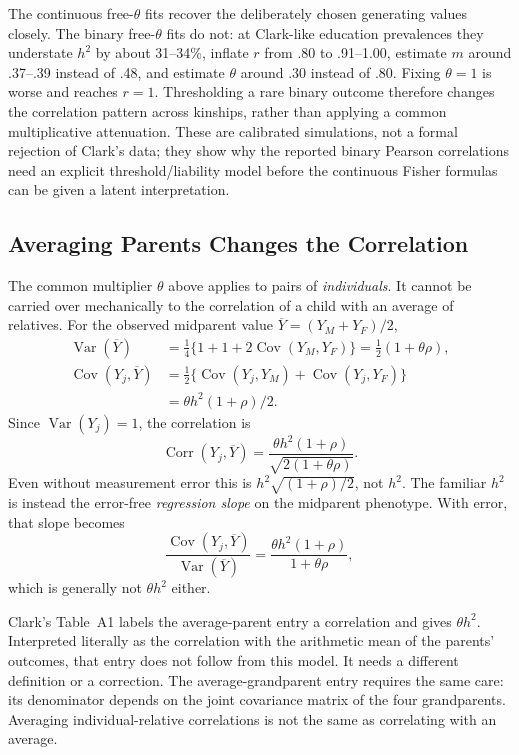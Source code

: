 The continuous free-$\theta$ fits recover the deliberately chosen generating
values closely. The binary free-$\theta$ fits do not: at Clark-like education
prevalences they understate $h^2$ by about 31--34\%, inflate $r$ from .80 to
.91--1.00, estimate $m$ around .37--.39 instead of .48, and estimate
$\theta$ around .30 instead of .80. Fixing $\theta=1$ is worse and reaches
$r=1$. Thresholding a rare binary outcome therefore changes the correlation
pattern across kinships, rather than applying a common multiplicative
attenuation. These are calibrated simulations, not a formal rejection of
Clark's data; they show why the reported binary Pearson correlations need an
explicit threshold/liability model before the continuous Fisher formulas can
be given a latent interpretation.
\subsection{Averaging Parents Changes the Correlation}
\label{sec:me-averages}

The common multiplier $\theta$ above applies to pairs of \emph{individuals}.
It cannot be carried over mechanically to the correlation of a child
with an average of relatives. For the observed midparent value
$\overline Y=(Y_M+Y_F)/2$,
\begin{align*}
 \operatorname{Var}(\overline Y)
 &=\tfrac14\{1+1+2\operatorname{Cov}(Y_M,Y_F)\}
   =\tfrac12(1+\theta\rho),\\
 \operatorname{Cov}(Y_j,\overline Y)
 &=\tfrac12\{\operatorname{Cov}(Y_j,Y_M)
             +\operatorname{Cov}(Y_j,Y_F)\}\\
 &=\theta h^2(1+\rho)/2.
\end{align*}
Since $\operatorname{Var}(Y_j)=1$, the correlation is
\begin{equation}
 \boxed{\operatorname{Corr}(Y_j,\overline Y)
 =\frac{\theta h^2(1+\rho)}
        {\sqrt{2(1+\theta\rho)}}.}
 \label{eq:me-midparent}
\end{equation}
Even without measurement error this is
$h^2\sqrt{(1+\rho)/2}$, not $h^2$. The familiar $h^2$ is instead the
error-free \emph{regression slope} on the midparent phenotype.
With error, that slope becomes
\[
 \frac{\operatorname{Cov}(Y_j,\overline Y)}
      {\operatorname{Var}(\overline Y)}
 =\frac{\theta h^2(1+\rho)}{1+\theta\rho},
\]
which is generally not $\theta h^2$ either.

Clark's Table~A1 labels the average-parent entry a correlation and gives
$\theta h^2$. Interpreted literally as the correlation with the arithmetic
mean of the parents' outcomes, that entry does not follow from this model.
It needs a different definition or a correction. The average-grandparent
entry requires the same care: its denominator depends on the joint
covariance matrix of the four grandparents. Averaging individual-relative
correlations is not the same as correlating with an average.

